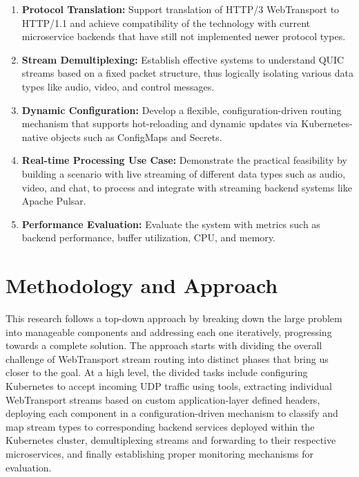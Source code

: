 \begin{enumerate}
\item \textbf{Protocol Translation:} Support translation of HTTP/3 WebTransport to HTTP/1.1 and achieve compatibility of the technology with current microservice backends that have still not implemented newer protocol types.

\item \textbf{Stream Demultiplexing:} Establish effective systems to understand QUIC streams based on a fixed packet structure, thus logically isolating various data types like audio, video, and control messages.

\item \textbf{Dynamic Configuration:} Develop a flexible, configuration-driven routing mechanism that supports hot-reloading and dynamic updates via Kubernetes-native objects such as ConfigMaps and Secrets.

\item \textbf{Real-time Processing Use Case:} Demonstrate the practical feasibility by building a scenario with live streaming of different data types such as audio, video, and chat, to process and integrate with streaming backend systems like Apache Pulsar.

\item \textbf{Performance Evaluation:} Evaluate the system with metrics such as backend performance, buffer utilization, CPU, and memory.

\end{enumerate}

\section{Methodology and Approach}

This research follows a top-down approach by breaking down the large problem into manageable components and addressing each one iteratively, progressing towards a complete solution. The approach starts with dividing the overall challenge of WebTransport stream routing into distinct phases that bring us closer to the goal. At a high level, the divided tasks include configuring Kubernetes to accept incoming UDP traffic using tools, extracting individual WebTransport streams based on custom application-layer defined headers, deploying each component in a configuration-driven mechanism to classify and map stream types to corresponding backend services deployed within the Kubernetes cluster, demultiplexing streams and forwarding to their respective microservices, and finally establishing proper monitoring mechanisms for evaluation.

